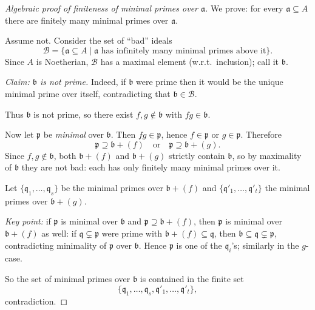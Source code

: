 \documentclass[11pt,a4paper]{article}
\theoremstyle{definition}
\theoremstyle{plain}
\theoremstyle{remark}
\begin{document}
\begin{proof}[Algebraic proof of finiteness of minimal primes over $\mathfrak a$]
We prove: for every $\mathfrak a\subseteq A$ there are finitely many minimal primes over $\mathfrak a$.

Assume not. Consider the set of ``bad'' ideals
\[
\mathcal B=\{\mathfrak a\subseteq A \mid \mathfrak a \text{ has infinitely many minimal primes above it}\}.
\]
Since $A$ is Noetherian, $\mathcal B$ has a maximal element (w.r.t.\ inclusion); call it $\mathfrak b$.

\emph{Claim: $\mathfrak b$ is not prime.}
Indeed, if $\mathfrak b$ were prime then it would be the unique minimal prime over itself,
contradicting that $\mathfrak b\in\mathcal B$.

Thus $\mathfrak b$ is not prime, so there exist $f,g\notin\mathfrak b$ with $fg\in\mathfrak b$.

Now let $\mathfrak p$ be \emph{minimal} over $\mathfrak b$. Then $fg\in\mathfrak p$, hence
$f\in\mathfrak p$ or $g\in\mathfrak p$. Therefore
\[
\mathfrak p \supseteq \mathfrak b+(f)\quad\text{or}\quad \mathfrak p\supseteq \mathfrak b+(g).
\]
Since $f,g\notin\mathfrak b$, both $\mathfrak b+(f)$ and $\mathfrak b+(g)$ strictly contain $\mathfrak b$,
so by maximality of $\mathfrak b$ they are not bad: each has only finitely many minimal primes over it.

Let $\{\mathfrak q_1,\dots,\mathfrak q_s\}$ be the minimal primes over $\mathfrak b+(f)$ and
$\{\mathfrak q'_1,\dots,\mathfrak q'_t\}$ the minimal primes over $\mathfrak b+(g)$.

\emph{Key point:} if $\mathfrak p$ is minimal over $\mathfrak b$ and $\mathfrak p\supseteq \mathfrak b+(f)$,
then $\mathfrak p$ is minimal over $\mathfrak b+(f)$ as well:
if $\mathfrak q\subsetneq \mathfrak p$ were prime with $\mathfrak b+(f)\subseteq\mathfrak q$,
then $\mathfrak b\subseteq\mathfrak q\subsetneq\mathfrak p$, contradicting minimality of $\mathfrak p$ over $\mathfrak b$.
Hence $\mathfrak p$ is one of the $\mathfrak q_i$'s; similarly in the $g$-case.

So the set of minimal primes over $\mathfrak b$ is contained in the finite set
\[
\{\mathfrak q_1,\dots,\mathfrak q_s,\mathfrak q'_1,\dots,\mathfrak q'_t\},
\]
contradiction.
\end{proof}
\end{document}
